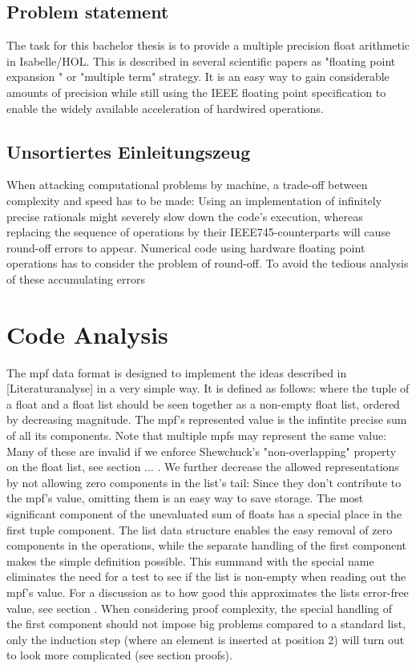\documentclass[11pt,a4paper]{article}
\begin{document}
\subsection{Problem statement}

The task for this bachelor thesis is to provide a multiple precision float arithmetic in Isabelle/HOL. This is described in several scientific papers as "floating point expansion " or "multiple term" strategy. It is an easy way to gain considerable amounts of precision while still using the IEEE floating point specification to enable the widely available acceleration of hardwired operations.

\subsection{Unsortiertes Einleitungszeug}

When attacking computational problems by machine, a trade-off between complexity and speed has to be made: Using an implementation of infinitely precise rationals might severely slow down the code's execution, whereas replacing the sequence of operations by their IEEE745-counterparts will cause round-off errors to appear. Numerical code using hardware floating point operations has to consider the problem of round-off. To avoid the tedious analysis of these accumulating errors

\section{Code Analysis}

The mpf data format is designed to implement the ideas described in [Literaturanalyse] in a very simple way. It is defined as follows:
\mpfdef
where the tuple of a float and a float list should be seen together as a non-empty float list, ordered by decreasing magnitude. The mpf's represented value is the infintite precise sum of all its components. Note that multiple mpfs may represent the same value:
Many of these are invalid if we enforce Shewchuck's "non-overlapping" property on the float list, see section ... . We further decrease the allowed representations by not allowing zero components in the list's tail: Since they don't contribute to the mpf's value, omitting them is an easy way to save storage.
The most significant component of the unevaluated sum of floats has a special place in the first tuple component. The list data structure enables the easy removal of zero components in the operations, while the separate handling of the first component makes the simple definition
\newline
\approxdef
\newline
possible. This summand with the special name \constapprox eliminates the need for a test to see if the list is non-empty when reading out the mpf's value. For a discussion as to how good this approximates the lists error-free value, see section     . When considering proof complexity, the special handling of the first component should not impose big problems compared to a standard list, only the induction step (where an element is inserted at position 2) will turn out to look more complicated (see section proofs).
\end{document}
